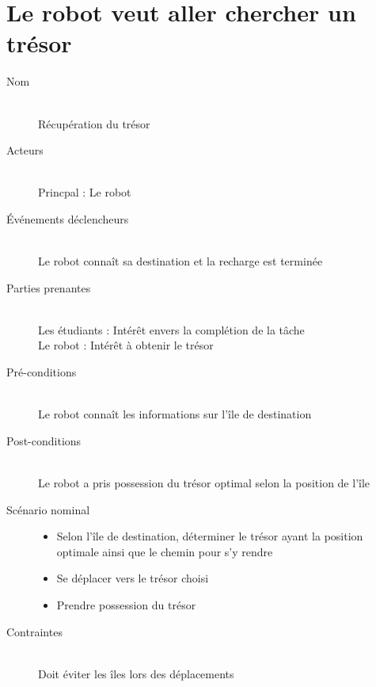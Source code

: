 \section{Le robot veut aller chercher un trésor}
\begin{description}
\item[Nom] \hfill \\
  Récupération du trésor
\item[Acteurs] \hfill \\
  Princpal : Le robot
\item[Événements déclencheurs] \hfill \\
  Le robot connaît sa destination et la recharge est terminée
\item[Parties prenantes] \hfill \\
  Les étudiants : Intérêt envers la complétion de la tâche \\
  Le robot : Intérêt à obtenir le trésor
\item[Pré-conditions] \hfill \\
  Le robot connaît les informations sur l'île de destination
\item[Post-conditions] \hfill \\
  Le robot a pris possession du trésor optimal selon la position de l'île
\item[Scénario nominal] \hfill
  \begin{itemize}
  \item Selon l'île de destination, déterminer le trésor ayant la position
    optimale ainsi que le chemin pour s'y rendre
  \item Se déplacer vers le trésor choisi
  \item Prendre possession du trésor
  \end{itemize}
\item[Contraintes] \hfill \\
  Doit éviter les îles lors des déplacements
\end{description}

